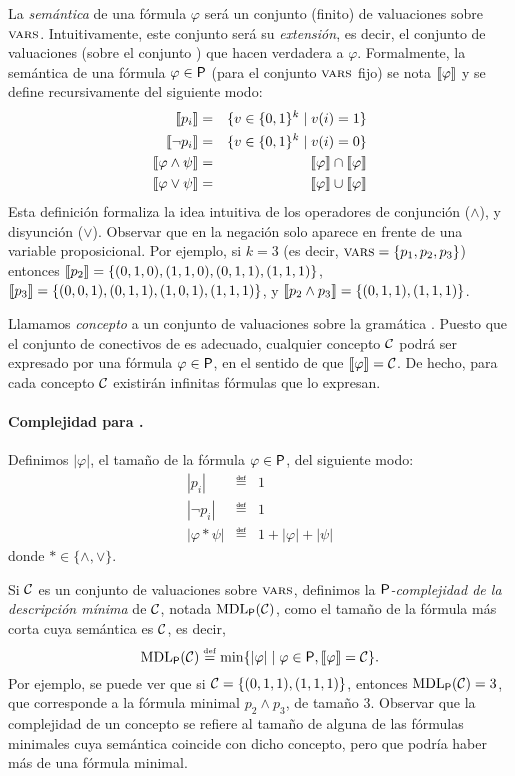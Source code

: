 La {\em semántica} de una fórmula $\varphi$ será un conjunto (finito) de valuaciones sobre $\textsc{vars}$. Intuitivamente, este conjunto será su {\em extensión}, es decir, el conjunto de valuaciones (sobre el conjunto \propvars) que hacen verdadera a $\varphi$. 
%
Formalmente, la semántica de una fórmula $\varphi\in{\sf P}$ (para el conjunto $\textsc{vars}$ fijo) se nota $\llbracket \varphi\rrbracket$ y se define recursivamente del siguiente modo:
%
\begin{eqnarray*}
\llbracket p_i\rrbracket &=& \{ v\in\{0,1\}^k \mid v(i)=1\}\\
\llbracket \lnot p_i\rrbracket &=& \{ v\in\{0,1\}^k \mid v(i)=0\}\\
\llbracket \varphi\wedge\psi\rrbracket &=& \llbracket \varphi\rrbracket\cap\llbracket \varphi\rrbracket\\
\llbracket \varphi\vee\psi\rrbracket &=& \llbracket \varphi\rrbracket\cup\llbracket \varphi\rrbracket
\end{eqnarray*}
Esta definición formaliza la idea intuitiva de los operadores de conjunción ($\wedge$), y disyunción ($\vee$). Observar que en \grambool la negación solo aparece en frente de una variable proposicional. Por ejemplo, si $k=3$ (es decir, $\textsc{vars}=\{p_1,p_2,p_3\}$) entonces $\llbracket p_2\rrbracket=\{(0,1,0), (1,1,0), (0,1,1), (1,1,1)\}$,  $\llbracket p_3\rrbracket=\{(0,0,1), (0,1,1), (1,0,1), (1,1,1)\}$, y $\llbracket p_2\wedge p_3\rrbracket=\{(0,1,1), (1,1,1)\}$.

Llamamos {\em concepto} a un conjunto de valuaciones sobre la gramática \grambool. Puesto que el conjunto de conectivos de \grambool es adecuado, cualquier concepto $\mathcal{C}$ podrá ser expresado por una fórmula $\varphi\in{\sf P}$, en el sentido de que $\llbracket \varphi\rrbracket=\mathcal{C}$. De hecho, para cada concepto $\mathcal{C}$ existirán infinitas fórmulas que lo expresan.

\paragraph{Complejidad para \grambool.} Definimos $|\varphi|$, el tamaño de la fórmula $\varphi\in{\sf P}$, del siguiente modo:
\begin{eqnarray*}
|p_i| &\eqdef& 1\\
|\lnot p_i| &\eqdef& 1\\
|\varphi*\psi| &\eqdef& 1+|\varphi|+|\psi|
\end{eqnarray*}
donde $*\in\{\wedge,\vee\}$.

Si $\mathcal{C}$ es un conjunto de valuaciones sobre $\textsc{vars}$, definimos la {\em ${\sf P}$-complejidad de la descripción mínima} de $\mathcal{C}$, notada ${\rm MDL}_{{\sf P}}(\mathcal{C})$, como el tamaño de la fórmula más corta cuya semántica es $\mathcal{C}$, es decir,
$$
{\rm MDL}_{{\sf P}}(\mathcal{C})\stackrel{\scriptscriptstyle \mathrm{def}}{=}\min\{|\varphi|\mid \varphi\in{\sf P},\llbracket \varphi\rrbracket=\mathcal{C}\}.
$$
Por ejemplo, se puede ver que si $\mathcal{C}=\{(0,1,1), (1,1,1)\}$, entonces ${\rm MDL}_{{\sf P}}(\mathcal{C})=3$, que corresponde a la fórmula minimal $p_2\wedge p_3$, de tamaño 3. Observar que la complejidad de un concepto se refiere al tamaño de alguna de las fórmulas minimales cuya semántica coincide con dicho concepto, pero que podría haber más de una fórmula minimal.


    \color{black}